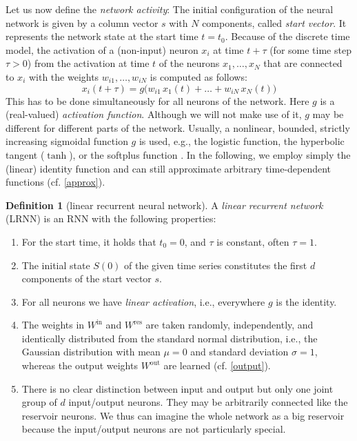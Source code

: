 \documentclass[twoside,11pt]{article}
\theoremstyle{definition}
\newtheorem{defn}{Definition}
\begin{document}
Let us now define the \emph{network activity}: The initial
configuration of the neural network is given by a column vector $s$ with $N$
components, called \emph{start vector}. It represents the network state at the
start time $t=t_0$. Because of the discrete time model, the activation
of a (non-input) neuron $x_i$ at time $t+\tau$ (for some time step $\tau>0$) from
the activation at time $t$ of the neurons $x_1,\dots,x_N$ that are connected to
$x_i$ with the weights $w_{i1},\dots,w_{iN}$ is computed as follows:
\begin{equation}\label{recur}
	x_i(t+\tau) = g\big(w_{i1}\,x_1(t) +\dots+ w_{iN}\,x_N(t)\big)
\end{equation}
This has to be done simultaneously for all neurons of the network. Here $g$ is a
(real-valued) \emph{activation function}. Although we will not make use of it,
$g$ may be different for different parts of the network.
Usually, a nonlinear, bounded, strictly increasing sigmoidal function $g$ is
used, e.g., the logistic function, the hyperbolic tangent ($\tanh$), or the
softplus function \citep[Sect.~3.10]{GBC16}. In the following, we employ simply
the (linear) identity function and can still approximate arbitrary
time-dependent functions (cf. \cref{approx}).

\begin{defn}[linear recurrent neural network]\label{thedef}
A \emph{linear recurrent network} (LRNN) is an RNN with the
following properties:
\begin{enumerate}
  \item For the start time, it holds that $t_0=0$, and $\tau$ is constant, often $\tau=1$.
  \item The initial state $S(0)$ of the given time series constitutes the first
	$d$ components of the start vector $s$.
  \item For all neurons we have \emph{linear activation}, i.e., everywhere $g$
	is the identity.
  \item The weights in $W^\mathrm{in}$ and $W^\mathrm{res}$ are taken
	randomly, independently, and identically distributed from the standard
	normal distribution, i.e., the Gaussian distribution with mean $\mu = 0$
	and standard deviation $\sigma = 1$, whereas the output weights
	$W^\mathrm{out}$ are learned (cf. \cref{output}).
  \item There is no clear distinction between input and output but only one joint
	group of $d$ input/output neurons. They may be arbitrarily connected
	like the reservoir neurons. We thus can imagine the whole network as a
	big reservoir because the input/output neurons are not particularly
	special.
\end{enumerate}
\end{defn}
\end{document}
